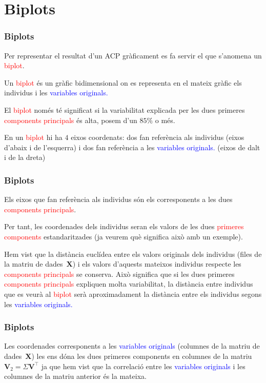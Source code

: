 \documentclass[12pt,t]{beamer}
\newcommand{\red}[1]{\textcolor{red}{#1}}
\newcommand{\blue}[1]{\textcolor{blue}{#1}}
\theoremstyle{plain}
\theoremstyle{definition}
\begin{document}
\section{Biplots}
\begin{frame}
\frametitle{Biplots}
Per representar el resultat d'un ACP gràficament es fa servir el que s'anomena un \red{biplot}. 
\medskip

Un \red{biplot} és un gràfic bidimensional on es representa en el mateix gràfic els individus i les \blue{variables 
originals.}
\medskip

El \red{biplot} només té significat si la variabilitat explicada per les dues primeres \red{components principals} és 
alta, posem d'un $85\%$ o més. 
\medskip

En un \red{biplot} hi ha $4$ eixos coordenats: dos fan referència als individus (eixos d'abaix i de l'esquerra) i dos 
fan referència a les \blue{variables originals.} (eixos de dalt i de la dreta)
\end{frame}

\begin{frame}
\frametitle{Biplots}
Els eixos que fan referència als individus són els corresponents a les dues \red{components principals}.
\medskip

Per tant, les coordenades dels individus seran els valors de les dues \red{primeres components} estandaritzades (ja 
veurem què significa això amb un exemple).
\medskip

Hem vist que la distància euclídea entre els valors originals dels individus (files de la matriu de dades~$\mathbf{X}$) 
i els valors d'aquests mateixos individus respecte les \red{components principals} se conserva. Això significa que si 
les dues primeres \red{components principals} expliquen molta variabilitat, la distància entre individus que es veurà al 
\red{biplot} serà aproximadament la distància entre els individus segons les \blue{variables originals.}
\medskip

\end{frame}


\begin{frame}
\frametitle{Biplots}

Les coordenades corresponents a les \blue{variables originals} (columnes de la matriu de dades~$\mathbf{X}$) les ens 
dóna les dues primeres components en columnes de la matriu $\mathbf{V}_2 = \Sigma\mathbf{V}^\top$ ja que hem vist que la 
correlació entre les \blue{variables originals} i les columnes de la matriu anterior és la mateixa.

\end{frame}
\end{document}

